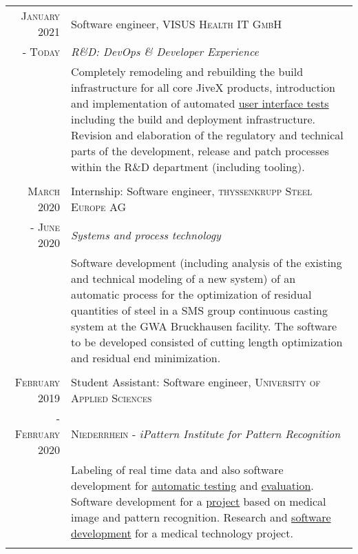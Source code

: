 \documentclass[10pt,a4paper]{article}
\begin{document}
\begin{tabular}{r|p{11cm}}
	\textsc{January} 2021 	& Software engineer, \textsc{VISUS Health IT GmbH} \\
	- \textsc{Today} 		& \emph{R\&D: DevOps \& Developer Experience} \\
						& \footnotesize{Completely remodeling and rebuilding the build infrastructure for all core JiveX products, introduction and implementation of automated \href{https://www.qfs.de}{user interface tests} including the build and deployment infrastructure. Revision and elaboration of the regulatory and technical parts of the development, release and patch processes within the R\&D department (including tooling).} \\
	\multicolumn{2}{c}{} \\
	
	\textsc{March} 2020 		& Internship: Software engineer, \textsc{thyssenkrupp Steel Europe AG} \\
	- \textsc{June} 2020 		& \emph{Systems and process technology} \\
						& \footnotesize{Software development (including analysis of the existing and technical modeling of a new system) of an automatic process for the optimization of residual quantities of steel in a SMS group continuous casting system at the GWA Bruckhausen facility. The software to be developed consisted of cutting length optimization and residual end minimization.} \\
	\multicolumn{2}{c}{} \\

 	\textsc{February} 2019	& Student Assistant: Software engineer, \textsc{University of Applied Sciences} \\
	- \textsc{February} 2020	& \textsc{Niederrhein} - \emph{iPattern Institute for Pattern Recognition} \\
						& \footnotesize{Labeling of real time data and also software development for \href{https://github.com/thahnen/labelbox-export-minifier}{automatic testing} and \href{https://github.com/thahnen/labelbox-scripts-etc}{evaluation}. Software development for a \href{https://www.hs-niederrhein.de/ipattern/nachrichten-detailseite/?tx_news_pi1\%5Bnews\%5D=9545\&cHash=3202e26ca1ce23d3b3231df1f5c5a573}{project} based on medical image and pattern recognition. Research and \href{https://github.com/thahnen/elastix-scripts-etc}{software development} for a medical technology project.} \\
	\multicolumn{2}{c}{} \\
	

\end{tabular}
\end{document}
